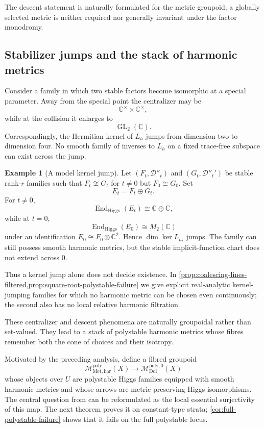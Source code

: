 \documentclass[11pt,reqno]{amsart}
\theoremstyle{definition}
\newtheorem{example}[theorem]{Example}
\theoremstyle{remark}
\newcommand{\C}{\mathbb C}
\newcommand{\cD}{\mathcal D}
\newcommand{\End}{\operatorname{End}}
\newcommand{\Dol}{\mathrm{Dol}}
\newcommand{\har}{\mathrm{har}}
\newcommand{\poly}{\mathrm{poly}}
\newcommand{\MdiffDol}{\mathscr M_{\Dol}}
\newcommand{\MetHar}{\mathscr M_{\mathrm{Met},\har}}
\begin{document}
The descent statement is naturally formulated for the metric groupoid; a globally selected metric is neither required nor generally invariant under the factor monodromy.

\subsection{Stabilizer jumps and the stack of harmonic metrics}

Consider a family in which two stable factors become isomorphic at a special parameter.  Away from the special point the centralizer may be
\[
  \C^\times\times\C^\times,
\]
while at the collision it enlarges to
\[
  \operatorname{GL}_2(\C).
\]
Correspondingly, the Hermitian kernel of $L_h$ jumps from dimension two to dimension four.  No smooth family of inverses to $L_h$ on a fixed trace-free subspace can exist across the jump.

\begin{example}[A model kernel jump]\label{ex:kernel-jump}
Let $(F_t,\cD''_t)$ and $(G_t,\cD''_t{}')$ be stable rank-$r$ families such that $F_t\not\cong G_t$ for $t\ne0$ but $F_0\cong G_0$.  Set
\[
  E_t=F_t\oplus G_t.
\]
For $t\ne0$,
\[
  \End_{\mathrm{Higgs}}(E_t)\cong\C\oplus\C,
\]
while at $t=0$,
\[
  \End_{\mathrm{Higgs}}(E_0)\cong M_2(\C)
\]
under an identification $E_0\cong F_0\otimes\C^2$.  Hence $\dim\ker L_{h_t}$ jumps.  The family can still possess smooth harmonic metrics, but the stable implicit-function chart does not extend across $0$.
\end{example}

Thus a kernel jump alone does not decide existence.  In \cref{prop:coalescing-lines-filtered,prop:square-root-polystable-failure} we give explicit real-analytic kernel-jumping families for which no harmonic metric can be chosen even continuously; the second also has no local relative harmonic filtration.


These centralizer and descent phenomena are naturally groupoidal rather than set-valued.  They lead to a stack of polystable harmonic metrics whose fibres remember both the cone of choices and their isotropy.


Motivated by the preceding analysis, define a fibred groupoid
\[
  \MetHar^{\poly}(X)\to\MdiffDol^{\poly,0}(X)
\]
whose objects over $U$ are polystable Higgs families equipped with smooth harmonic metrics and whose arrows are metric-preserving Higgs isomorphisms.  The central question from \cite{AzamRayan2026} can be reformulated as the local essential surjectivity of this map.  The next theorem proves it on constant-type strata; \cref{cor:full-polystable-failure} shows that it fails on the full polystable locus.
\end{document}
